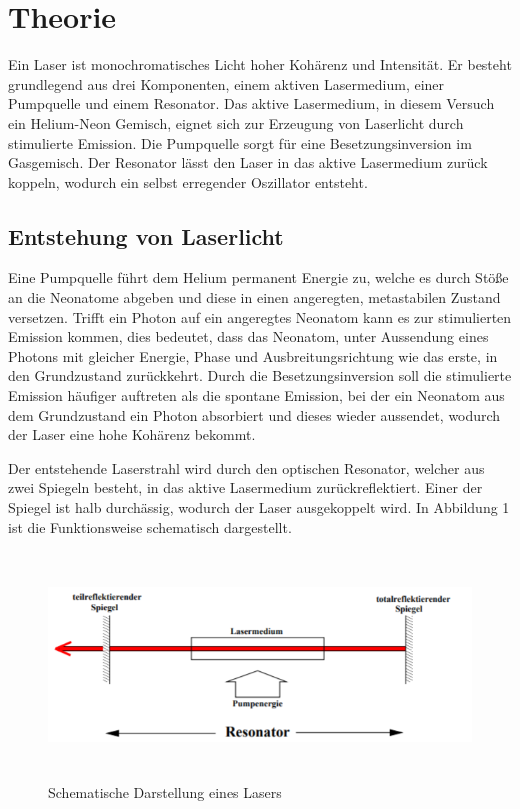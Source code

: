 \section{Theorie}
\label{sec:Theorie}

\cite{sample}

Ein Laser ist monochromatisches Licht hoher Kohärenz und Intensität. Er besteht grundlegend aus drei
Komponenten, einem aktiven Lasermedium, einer Pumpquelle und einem Resonator.
Das aktive Lasermedium, in diesem Versuch ein Helium-Neon Gemisch, eignet sich zur Erzeugung
von Laserlicht durch stimulierte Emission. Die Pumpquelle sorgt für eine Besetzungsinversion im Gasgemisch.
Der Resonator lässt den Laser in das aktive Lasermedium zurück koppeln, wodurch ein
selbst erregender Oszillator entsteht.

\subsection{Entstehung von Laserlicht}
Eine Pumpquelle führt dem Helium permanent Energie zu, welche es durch Stöße an
die Neonatome abgeben und diese in einen angeregten, metastabilen Zustand versetzen.
Trifft ein Photon auf ein angeregtes Neonatom kann es zur stimulierten Emission kommen, dies
bedeutet, dass das Neonatom, unter Aussendung eines Photons mit gleicher Energie, Phase und
Ausbreitungsrichtung wie das erste, in den Grundzustand zurückkehrt. Durch die Besetzungsinversion soll
die stimulierte Emission häufiger auftreten als die spontane Emission, bei der ein Neonatom aus
dem Grundzustand ein Photon absorbiert und dieses wieder aussendet, wodurch der Laser eine hohe
Kohärenz bekommt.

Der entstehende Laserstrahl wird durch den optischen Resonator, welcher aus zwei Spiegeln besteht,
in das aktive Lasermedium zurückreflektiert. Einer der Spiegel ist halb durchässig, wodurch der
Laser ausgekoppelt wird. In Abbildung 1 ist die Funktionsweise schematisch dargestellt.

\begin{figure}[H]
  \centering
  \includegraphics[height=6cm]{Lasermedium.PNG}
  \caption{Schematische Darstellung eines Lasers \cite{sample}}
  \label{fig:Lock}
\end{figure}


